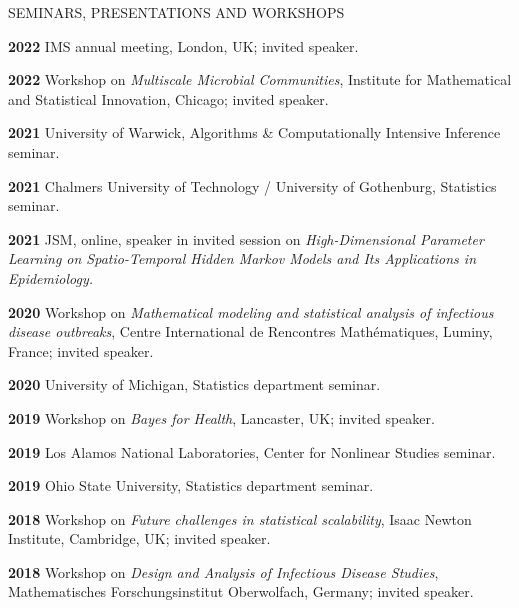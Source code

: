 \begin{mylist}{SEMINARS, PRESENTATIONS AND WORKSHOPS}
  \setlength{\itemsep}{0.15 cm}

\item{\bf 2022} IMS annual meeting, London, UK; invited speaker.
  
\item{\bf 2022} Workshop on {\it Multiscale Microbial Communities}, Institute for Mathematical and Statistical Innovation, Chicago; invited speaker.
  
\item{\bf 2021} University of Warwick, Algorithms \& Computationally Intensive Inference seminar.
               
\item{\bf 2021} Chalmers University of Technology / University of Gothenburg, Statistics seminar.
                 
\item{\bf 2021} JSM, online, speaker in invited session on {\it High-Dimensional Parameter Learning on Spatio-Temporal Hidden Markov Models and Its Applications in Epidemiology.}
                 
\item{\bf 2020 } Workshop on {\it Mathematical modeling and statistical analysis of infectious disease outbreaks}, Centre International de Rencontres Math\'{e}matiques, Luminy, France; invited speaker.

\item{\bf 2020 } University of Michigan, Statistics department seminar.

\item{\bf 2019 } Workshop on {\it Bayes for Health}, Lancaster, UK; invited speaker.

  \item{\bf 2019 } Los Alamos National Laboratories, Center for Nonlinear Studies seminar.
  
  \item{\bf 2019 } Ohio State University, Statistics department seminar.
  
\item{\bf 2018 } Workshop on {\it Future challenges in statistical scalability}, Isaac Newton Institute, Cambridge, UK; invited speaker.

\item{\bf 2018 }  Workshop on {\it Design and Analysis of Infectious Disease Studies}, Mathematisches Forschungsinstitut Oberwolfach, Germany; invited speaker.


\end{mylist}
